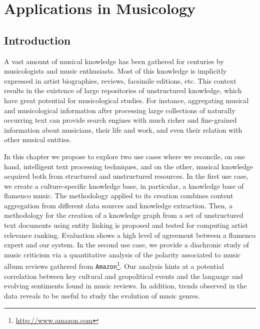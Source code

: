 
\chapter{Applications in Musicology}
\label{sec:musicology}

\section{Introduction}
\label{sec:musicology:introduction}

A vast amount of musical knowledge has been gathered for centuries by musicologists and music enthusiasts. Most of this knowledge is implicitly expressed in artist biographies, reviews, facsimile editions, etc. %
This context results in the existence of large repositories of unstructured knowledge, which have great potential for musicological studies.
For instance, aggregating musical and musicological information after processing large collections of naturally occurring text can provide search engines with much richer and fine-grained information about musicians, their life and work, and even their relation with other musical entities.

In this chapter we propose to explore two use cases where we reconcile, on one hand, intelligent text processing techniques, and on the other, musical knowledge acquired both from structured and unstructured resources. In the first use case, we create a culture-specific knowledge base, in particular, a knowledge base of flamenco music. The methodology applied to its creation combines content aggregation from different data sources and knowledge extraction. Then, a methodology for the creation of a knowledge graph from a set of unstructured text documents using entity linking is proposed and tested for computing artist relevance ranking. Evaluation shows a high level of agreement between a flamenco expert and our system.
In the second use case, we provide a diachronic study of music criticism via a quantitative analysis of the polarity associated to music album reviews gathered from \texttt{Amazon}\footnote{\url{http://www.amazon.com}}. Our analysis hints at a potential correlation between key cultural and geopolitical events and the language and evolving sentiments found in music reviews. In addition, trends observed in the data reveals to be useful to study the evolution of music genres.


